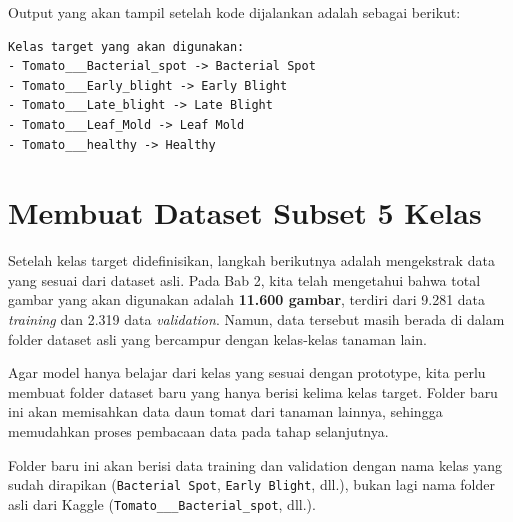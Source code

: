 Output yang akan tampil setelah kode dijalankan adalah sebagai berikut:

\begin{outputcode}[H]
\begin{lstlisting}[language={}]
Kelas target yang akan digunakan:
- Tomato___Bacterial_spot -> Bacterial Spot
- Tomato___Early_blight -> Early Blight
- Tomato___Late_blight -> Late Blight
- Tomato___Leaf_Mold -> Leaf Mold
- Tomato___healthy -> Healthy
\end{lstlisting}
\caption{Output penentuan kelas target}
\end{outputcode}

\section{Membuat Dataset Subset 5 Kelas}

Setelah kelas target didefinisikan, langkah berikutnya adalah mengekstrak data yang sesuai dari dataset asli. Pada Bab 2, kita telah mengetahui bahwa total gambar yang akan digunakan adalah \textbf{11.600 gambar}, terdiri dari 9.281 data \textit{training} dan 2.319 data \textit{validation}. Namun, data tersebut masih berada di dalam folder dataset asli yang bercampur dengan kelas-kelas tanaman lain.

Agar model hanya belajar dari kelas yang sesuai dengan prototype, kita perlu membuat folder dataset baru yang hanya berisi kelima kelas target. Folder baru ini akan memisahkan data daun tomat dari tanaman lainnya, sehingga memudahkan proses pembacaan data pada tahap selanjutnya.

Folder baru ini akan berisi data training dan validation dengan nama kelas yang sudah dirapikan (\texttt{Bacterial Spot}, \texttt{Early Blight}, dll.), bukan lagi nama folder asli dari Kaggle (\texttt{Tomato\_\_\_\allowbreak Bacterial\_spot}, dll.).

